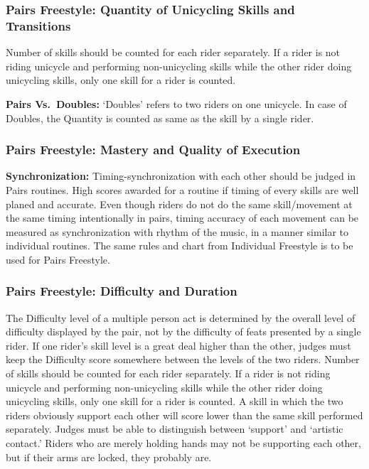 \subsubsection{Pairs Freestyle: Quantity of Unicycling Skills and Transitions \label{subsec:freestyle_pairs-additional-judging-criteria_quantity}}
Number of skills should be counted for each rider separately.
If a rider is not riding unicycle and performing non-unicycling skills while the other rider doing unicycling skills, only one skill for a rider is counted.

\textbf{Pairs Vs.\ Doubles:} `Doubles' refers to two riders on one unicycle.
In case of Doubles, the Quantity is counted as same as the skill by a single rider.

\subsubsection{Pairs Freestyle: Mastery and Quality of Execution}
\textbf{Synchronization:} Timing-synchronization with each other should be judged in Pairs routines.
High scores awarded for a routine if timing of every skills are well planed and accurate.
Even though riders do not do the same skill/movement at the same timing intentionally in pairs, timing accuracy of each movement can be measured as synchronization with rhythm of the music, in a manner similar to individual routines.
The same rules and chart from Individual Freestyle is to be used for Pairs Freestyle.

\subsubsection{Pairs Freestyle: Difficulty and Duration \label{subsec:freestyle_pairs-additional-judging-criteria_difficulty-duration}}
The Difficulty level of a multiple person act is determined by the overall level of difficulty displayed by the pair, not by the difficulty of feats presented by a single rider.
If one rider's skill level is a great deal higher than the other, judges must keep the Difficulty score somewhere between the levels of the two riders.
Number of skills should be counted for each rider separately.
If a rider is not riding unicycle and performing non-unicycling skills while the other rider doing unicycling skills, only one skill for a rider is counted.
A skill in which the two riders obviously support each other will score lower than the same skill performed separately.
Judges must be able to distinguish between `support' and `artistic contact.' Riders who are merely holding hands may not be supporting each other, but if their arms are locked, they probably are.

